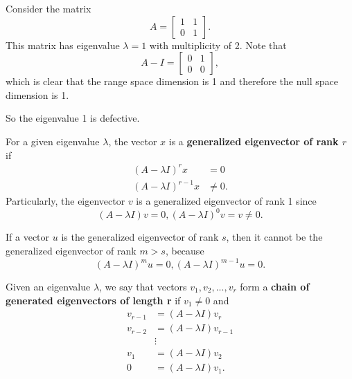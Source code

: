 \begin{refsection}
\begin{example}
Consider the matrix 
$$A = \begin{bmatrix}
1 & 1\\
0 & 1
\end{bmatrix}.$$
This matrix has eigenvalue $\lambda = 1$ with multiplicity of 2. 
Note that
$$A - I = \begin{bmatrix}
0 & 1\\
0 & 0
\end{bmatrix},$$
which is clear that the range space dimension is 1 and therefore the null space dimension is 1. 

So the eigenvalue 1 is defective.	
\end{example}








\begin{definition}
For a given eigenvalue $\lambda$, the vector $x$ is a \textbf{generalized eigenvector of rank $r$} if
\begin{align*}
(A - \lambda I)^rx &= 0\\
(A - \lambda I)^{r-1}x &\neq 0.
\end{align*}
Particularly, the eigenvector $v$ is a generalized eigenvector of rank 1 since 
$$(A-\lambda I)v = 0, (A-\lambda I)^0 v = v \neq 0.$$
\end{definition}

\begin{remark}
If a vector $u$ is the generalized eigenvector of rank $s$, then it cannot be the generalized eigenvector of rank $m > s$, because $$(A - \lambda I)^{m}u = 0, (A - \lambda I)^{m-1}u = 0.$$
\end{remark}

\begin{definition}
Given an eigenvalue $\lambda$, we say that vectors $v_1,v_2,...,v_r$ form a \textbf{chain of generated eigenvectors of length r} if $v_1\neq 0$ and 
	\begin{align*}
v_{r-1} &= (A - \lambda I)v_r\\
v_{r-2} &= (A - \lambda I)v_{r-1}\\
&\vdots\\
v_{1} &= (A - \lambda I)v_{2}\\
0 &= (A - \lambda I)v_{1}.
\end{align*}	


\end{definition}
\end{refsection}
